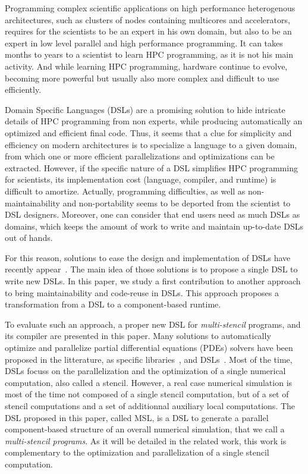 Programming complex scientific applications on high performance heterogenous architectures, such as clusters of nodes containing multicores and accelerators, requires for the scientists to be an expert in his own domain, but also to be an expert in low level parallel and high performance programming. It can takes months to years to a scientist to learn HPC programming, as it is not his main activity. And while learning HPC programming, hardware continue to evolve, becoming more powerful but usually also more  complex and difficult to use efficiently.

Domain Specific Languages (DSLs) are a promising solution to hide intricate details of HPC programming from non experts, while producing automatically an optimized and efficient final code. Thus, it seems that a clue for simplicity and efficiency on modern architectures is to specialize a language to a given domain, from which one or more efficient parallelizations and optimizations can be extracted.
However, if the specific nature of a DSL simplifies HPC programming for scientists, its implementation cost (language, compiler, and runtime) is difficult to amortize. Actually, programming difficulties, as well as non-maintainability and non-portability seems to be deported from the scientist to DSL designers. Moreover, one can consider that end users need as much DSLs as domains, which keeps the amount of work to write and maintain up-to-date DSLs out of hands.

For this reason, solutions to ease the design and implementation of DSLs have recently appear~\cite{Fernandez:2014:DFL:2691166.2691168}. The main idea of those solutions is to propose a single DSL to write new DSLs. In this paper, we study a first contribution to another approach to bring maintainability and code-reuse in DSLs. This approach proposes a transformation from a DSL to a component-based runtime. 

To evaluate such an approach, a proper new DSL for \emph{multi-stencil} programs, and its compiler are presented in this paper. Many solutions to automatically optimize and parallelize partial differential equations (PDEs) solvers have been proposed in the litterature, as specific libraries~\cite{petsc-efficient,Trilinos-Overview,CPE:CPE3494}, and DSLs~\cite{spaaTangCKLL11,citeulike12258902,Giles2011,DeVito2011LDS}. Most of the time, DSLs focuss on the parallelization and the optimization of a single numerical computation, also called a stencil.
However, a real case numerical simulation is most of the time not composed of a single stencil computation, but of a set of stencil computations and a set of additionnal auxiliary local computations. The DSL proposed in this paper, called MSL, is a DSL to generate a parallel component-based structure of an overall numerical simulation, that we call a \emph{multi-stencil programs}. As it will be detailed in the related work, this work is complementary to the optimization and parallelization of a single stencil computation.

